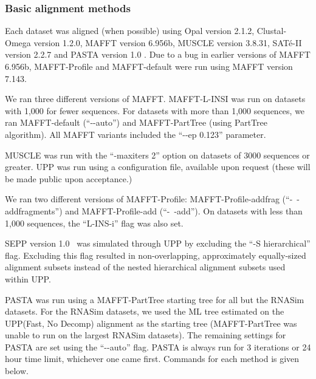\subsubsection{Basic alignment methods}\label{commands}
Each dataset was aligned (when possible) using Opal \cite{Wheeler2007} version 2.1.2, Clustal-Omega \cite{Sievers2011} version 1.2.0, MAFFT\cite{Katoh2002,Katoh2005,Katoh2012} version 6.956b, MUSCLE \cite{Edgar2004,Edgar2004a} version 3.8.31, SAT\'{e}-II ~\cite{Liu2012} version 2.2.7 and PASTA version 1.0 \cite{PASTA}.  Due to a bug in earlier versions of MAFFT 6.956b, MAFFT-Profile and MAFFT-default were run using MAFFT version 7.143.  

We ran three different versions of MAFFT.  MAFFT-L-INSI was run on datasets with 1,000 for fewer sequences.  For datasets with more than 1,000 sequences, we ran MAFFT-default (``-{}-auto'') and MAFFT-PartTree (using PartTree algorithm).  All MAFFT variants included the ``-{}-ep 0.123'' parameter.

MUSCLE was run with the ``-maxiters 2'' option on datasets of 3000 sequences or greater.  
UPP was run using a configuration file,
available upon request (these will be made
public upon acceptance.) %

We ran two different versions of MAFFT-Profile:  MAFFT-Profile-addfrag (``-~-addfragments'') and MAFFT-Profile-add (``-~-add'').  On datasets with less than 1,000 sequences, the ``L-INS-i'' flag was also set.  

SEPP version 1.0~\cite{Mirarab2012} was simulated through UPP by excluding the ``-S hierarchical'' flag.  Excluding this flag resulted in non-overlapping, approximately equally-sized alignment subsets instead of the nested hierarchical alignment subsets used within UPP.

PASTA was run using a MAFFT-PartTree starting tree for all but the RNASim datasets.  For the RNASim datasets, we used the ML tree estimated on the UPP(Fast, No Decomp) alignment as the starting tree (MAFFT-PartTree was unable to run on the largest RNASim datasets).  The remaining settings for PASTA are set using the ``-{}-auto'' flag.  PASTA is always run for 3 iterations or 24 hour time limit, whichever one came first.  Commands for each method is given below.

